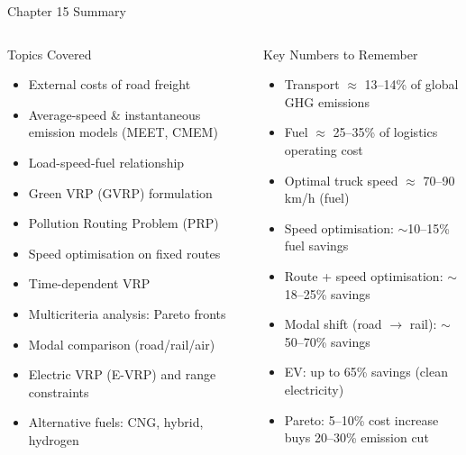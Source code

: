 \documentclass[aspectratio=169,10pt]{beamer}
\begin{document}
\begin{frame}[allowframebreaks]{Chapter 15 Summary}
  \begin{columns}[t]
    \begin{block}{Topics Covered}
      \begin{itemize}
        \item External costs of road freight
        \item Average-speed \& instantaneous emission models (MEET, CMEM)
        \item Load-speed-fuel relationship
        \item Green VRP (GVRP) formulation
        \item Pollution Routing Problem (PRP)
        \item Speed optimisation on fixed routes
        \item Time-dependent VRP
        \item Multicriteria analysis: Pareto fronts
        \item Modal comparison (road/rail/air)
        \item Electric VRP (E-VRP) and range constraints
        \item Alternative fuels: CNG, hybrid, hydrogen
      \end{itemize}
    \end{block}

    \begin{alertblock}{Key Numbers to Remember}
      \begin{itemize}
        \item Transport $\approx$ 13--14\% of global GHG emissions
        \item Fuel $\approx$ 25--35\% of logistics operating cost
        \item Optimal truck speed $\approx$ 70--90 km/h (fuel)
        \item Speed optimisation: $\sim$10--15\% fuel savings
        \item Route + speed optimisation: $\sim$18--25\% savings
        \item Modal shift (road $\to$ rail): $\sim$50--70\% savings
        \item EV: up to 65\% savings (clean electricity)
        \item Pareto: 5--10\% cost increase buys 20--30\% emission cut
      \end{itemize}
    \end{alertblock}


\end{columns}
\end{frame}
\end{document}
